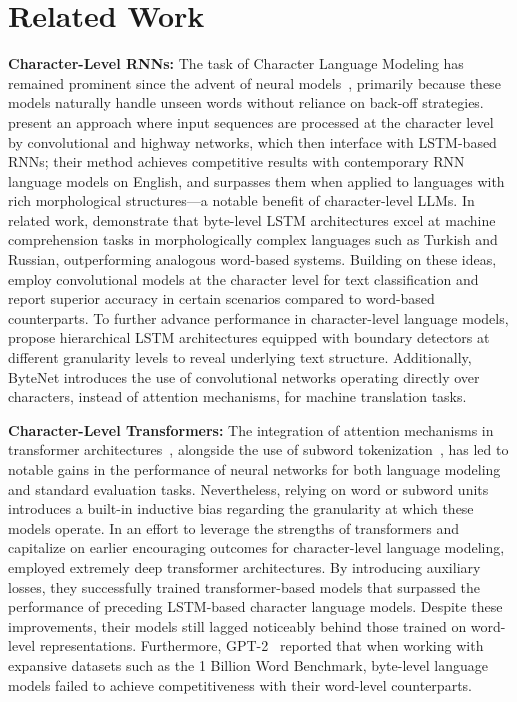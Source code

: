 \section{Related Work}
\label{section:related_work}

\textbf{Character-Level RNNs:} The task of Character Language Modeling has remained prominent since the advent of neural models~\citep{sutskever2011generating,mikolov2012subword,graves2013generating}, primarily because these models naturally handle unseen words without reliance on back-off strategies. \cite{kim2016character} present an approach where input sequences are processed at the character level by convolutional and highway networks, which then interface with LSTM-based RNNs; their method achieves competitive results with contemporary RNN language models on English, and surpasses them when applied to languages with rich morphological structures—a notable benefit of character-level LLMs. In related work, \cite{kenter2018byte} demonstrate that byte-level LSTM architectures excel at machine comprehension tasks in morphologically complex languages such as Turkish and Russian, outperforming analogous word-based systems. Building on these ideas, \cite{zhang2015character} employ convolutional models at the character level for text classification and report superior accuracy in certain scenarios compared to word-based counterparts. To further advance performance in character-level language models, \citet{chung2019hierarchical} propose hierarchical LSTM architectures equipped with boundary detectors at different granularity levels to reveal underlying text structure. Additionally, ByteNet \cite{kalchbrenner2016neural} introduces the use of convolutional networks operating directly over characters, instead of attention mechanisms, for machine translation tasks.

\textbf{Character-Level Transformers:} The integration of attention mechanisms in transformer architectures~\citep{vaswani2017attention}, alongside the use of subword tokenization~\citep{sennrich-etal-2016-neural}, has led to notable gains in the performance of neural networks for both language modeling and standard evaluation tasks. Nevertheless, relying on word or subword units introduces a built-in inductive bias regarding the granularity at which these models operate. In an effort to leverage the strengths of transformers and capitalize on earlier encouraging outcomes for character-level language modeling, \citet{al2019character} employed extremely deep transformer architectures. By introducing auxiliary losses, they successfully trained transformer-based models that surpassed the performance of preceding LSTM-based character language models. Despite these improvements, their models still lagged noticeably behind those trained on word-level representations. Furthermore, GPT-2~\citep{radfordgpt2} reported that when working with expansive datasets such as the 1 Billion Word Benchmark, byte-level language models failed to achieve competitiveness with their word-level counterparts.

